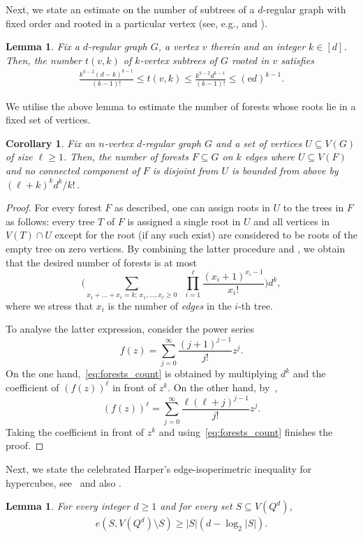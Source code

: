 \documentclass[reqno,final,a4paper]{amsart}
\newtheorem{corollary}[thm]{Corollary}
\newtheorem{lemma}[thm]{Lemma}
\theoremstyle{definition}
\def\e{\mathrm{e}}
\newcommand{\1}{\mathbbm{1}}
\begin{document}
Next, we state an estimate on the number of subtrees of a $d$-regular graph with fixed order and rooted in a particular vertex (see, e.g., \cite[Lemma 2]{BFM98} and \cite[Chapter 7]{K98}).
\begin{lemma}\label{l: trees}
Fix a $d$-regular graph $G$, a vertex $v$ therein and an integer $k\in [d]$.
Then, the number $t(v,k)$ of $k$-vertex subtrees of $G$ rooted in $v$ satisfies
\begin{align*}
\frac{k^{k-2}(d-k)^{k-1}}{(k-1)!}\le t(v,k) \le \frac{k^{k-2} d^{k-1}}{(k-1)!}\le (\e d)^{k-1}.
\end{align*}
\end{lemma}
We utilise the above lemma to estimate the number of forests whose roots lie in a fixed set of vertices. 
\begin{corollary}\label{cor:forests}
Fix an $n$-vertex $d$-regular graph $G$ and a set of vertices $U\subseteq V(G)$ of size $\ell\ge 1$. 
Then, the number of forests $F\subseteq G$ on $k$ edges where $U\subseteq V(F)$ and no connected component of $F$ is disjoint from $U$ is bounded from above by $(\ell+k)^k d^k/k!$\,.
\end{corollary}
\begin{proof}
For every forest $F$ as described, one can assign roots in $U$ to the trees in $F$ as follows: every tree $T$ of $F$ is assigned a single root in $U$ and all vertices in $V(T)\cap U$ except for the root (if any such exist) are considered to be roots of the empty tree on zero vertices.
By combining the latter procedure and , we obtain that the desired number of forests is at most
\begin{equation}\label{eq:forests_count}
\bigg(\sum_{x_1+\ldots+x_\ell=k;\, x_1,\ldots,x_\ell\ge 0}\;\;
\prod_{i=1}^{\ell} \frac{(x_i+1)^{x_i-1}}{x_i!}\bigg) d^k,
\end{equation}
where we stress that $x_i$ is the number of \textit{edges} in the $i$-th tree.

To analyse the latter expression, consider the power series
\[f(z) = \sum_{j=0}^{\infty} \frac{(j+1)^{j-1}}{j!} z^j.\]
On the one hand,~\eqref{eq:forests_count} is obtained by multiplying $d^k$ and the coefficient of $(f(z))^{\ell}$ in front of $z^k$. 
On the other hand, by~\cite[(2.36)]{CGHJK96},
\[(f(z))^{\ell} = \sum_{j=0}^{\infty} \frac{\ell(\ell+j)^{j-1}}{j!} z^j.\]
Taking the coefficient in front of $z^k$ and using~\eqref{eq:forests_count} finishes the proof.
\end{proof}

Next, we state the celebrated Harper's edge-isoperimetric inequality for hypercubes, see~\cite{H64} and also \cite{B67,H76,L64}.
\begin{lemma}\label{l: Harper}
For every integer $d \ge 1$ and for every set $S\subseteq V(Q^d)$,
\begin{align*}
e(S,V(Q^d)\setminus S)\ge |S|\left(d-\log_2|S|\right).
\end{align*}
\end{lemma}
\end{document}
